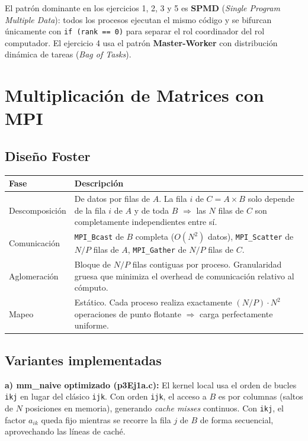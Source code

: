 \documentclass[12pt,a4paper]{article}
\begin{document}
El patrón dominante en los ejercicios 1, 2, 3 y 5 es \textbf{SPMD} (\textit{Single
Program Multiple Data}): todos los procesos ejecutan el mismo código y se bifurcan
únicamente con \texttt{if (rank == 0)} para separar el rol coordinador del rol
computador. El ejercicio 4 usa el patrón \textbf{Master-Worker} con distribución
dinámica de tareas (\textit{Bag of Tasks}).

\newpage

\section{Multiplicación de Matrices con MPI}

\subsection{Diseño Foster}

\begin{tabular}{L{3cm} L{11cm}}
\toprule
\textbf{Fase} & \textbf{Descripción} \\
\midrule
Descomposición & De datos por filas de $A$. La fila $i$ de $C = A \times B$
  solo depende de la fila $i$ de $A$ y de toda $B$ $\Rightarrow$ las $N$ filas de $C$
  son completamente independientes entre sí. \\[4pt]
Comunicación & \texttt{MPI\_Bcast} de $B$ completa ($O(N^2)$ datos),
  \texttt{MPI\_Scatter} de $N/P$ filas de $A$, \texttt{MPI\_Gather} de $N/P$
  filas de $C$. \\[4pt]
Aglomeración & Bloque de $N/P$ filas contiguas por proceso. Granularidad
  gruesa que minimiza el overhead de comunicación relativo al cómputo. \\[4pt]
Mapeo & Estático. Cada proceso realiza exactamente $(N/P) \cdot N^2$
  operaciones de punto flotante $\Rightarrow$ carga perfectamente uniforme. \\
\bottomrule
\end{tabular}

\vspace{0.5cm}

\subsection{Variantes implementadas}

\textbf{a) mm\_naive optimizado (p3Ej1a.c):} El kernel local usa el orden de
bucles \texttt{ikj} en lugar del clásico \texttt{ijk}. Con orden \texttt{ijk},
el acceso a $B$ es por columnas (saltos de $N$ posiciones en memoria), generando
\textit{cache misses} continuos. Con \texttt{ikj}, el factor $a_{ik}$ queda fijo
mientras se recorre la fila $j$ de $B$ de forma secuencial, aprovechando las
líneas de caché.
\end{document}
